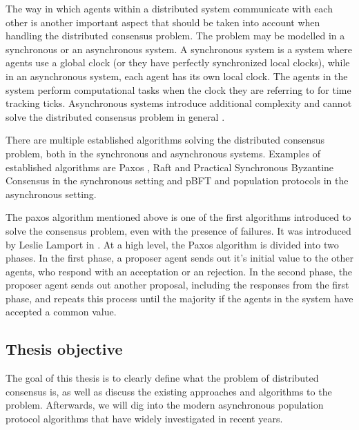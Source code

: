 The way in which agents within a distributed system communicate with each other is another important aspect that should be taken into account when handling the distributed consensus problem. The problem may be modelled in a synchronous or an asynchronous system. A synchronous system is a system where agents use a global clock (or they have perfectly synchronized local clocks), while in an asynchronous system, each agent has its own local clock. The agents in the system perform computational tasks when the clock they are referring to for time tracking ticks. Asynchronous systems introduce additional complexity and cannot solve the distributed consensus problem in general \cite{fischerImpossibilityDistributedConsensus}.

There are multiple established algorithms solving the distributed consensus problem, both in the synchronous and asynchronous systems. Examples of established algorithms are Paxos \cite{lamportFastPaxos2006}, Raft \cite{ongaroSearchUnderstandableConsensus} and Practical Synchronous Byzantine Consensus \cite{renPracticalSynchronousByzantine} in the synchronous setting and pBFT \cite{castroPracticalByzantineFault} and population protocols \cite{aspnesIntroductionPopulationProtocols2009} in the asynchronous setting.

The paxos algorithm mentioned above is one of the first algorithms introduced to solve the consensus problem, even with the presence of failures. It was introduced by Leslie Lamport  in \cite{lamportPartTimeParliment1998}. At a high level, the Paxos algorithm is divided into two phases. In the first phase, a proposer agent sends out it's initial value to the other agents, who respond with an acceptation or an rejection. In the second phase, the proposer agent sends out another proposal, including the responses from the first phase, and repeats this process until the majority if the agents in the system have accepted a common value. 


\clearpage

\subsection{Thesis objective}
The goal of this thesis is to clearly define what the problem of distributed consensus is, as well as discuss the existing approaches and algorithms to the problem. Afterwards, we will dig into the modern asynchronous population protocol algorithms that have widely investigated in recent years. 

